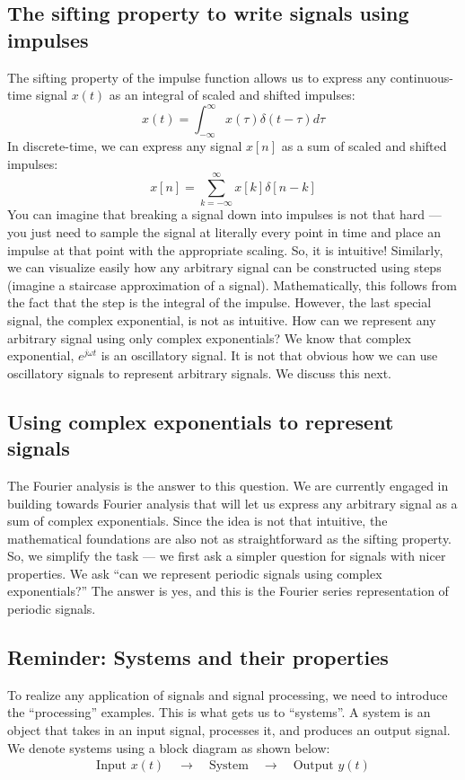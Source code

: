 \subsection{The sifting property to write signals using impulses}
The sifting property of the impulse function allows us to express any continuous-time signal $x(t)$ as an integral of scaled and shifted impulses:
\[
x(t) = \int_{-\infty}^{\infty} x(\tau) \delta(t - \tau) d\tau
\]
In discrete-time, we can express any signal $x[n]$ as a sum of scaled and shifted impulses:
\[
x[n] = \sum_{k=-\infty}^{\infty} x[k] \delta[n - k]
\]
 You can imagine that breaking a signal down into impulses is not that hard --- you just need to sample the signal at literally every point in time and place an impulse at that point with the appropriate scaling. So, it is intuitive! Similarly, we can visualize easily how any arbitrary signal can be constructed using steps (imagine a staircase approximation of a signal). Mathematically, this follows from the fact that the step is the integral of the impulse. However, the last special signal, the complex exponential, is not as intuitive. How can we represent any arbitrary signal using only complex exponentials? We know that complex exponential, $e^{j \omega t}$ is an oscillatory signal. It is not that obvious how we can use oscillatory signals to represent arbitrary signals. We discuss this next.
\subsection{Using complex exponentials to represent signals}
The Fourier analysis is the answer to this question. We are currently engaged in building towards Fourier analysis that will let us express any arbitrary signal as a sum of complex exponentials. Since the idea is not that intuitive, the mathematical foundations are also not as straightforward as the sifting property. So, we simplify the task --- we first ask a simpler question for signals with nicer properties. We ask ``can we represent periodic signals using complex exponentials?'' The answer is yes, and this is the Fourier series representation of periodic signals. 

\subsection{Reminder: Systems and their properties}
To realize any application of signals and signal processing, we need to introduce the ``processing'' examples. This is what gets us to ``systems''. A system is an object that takes in an input signal, processes it, and produces an output signal. We denote systems using a block diagram as shown below:
\[
\begin{array}{c}
\text{Input } x(t) \quad \longrightarrow \quad \boxed{\text{System}} \quad \longrightarrow \quad \text{Output } y(t)
\end{array}
\]


